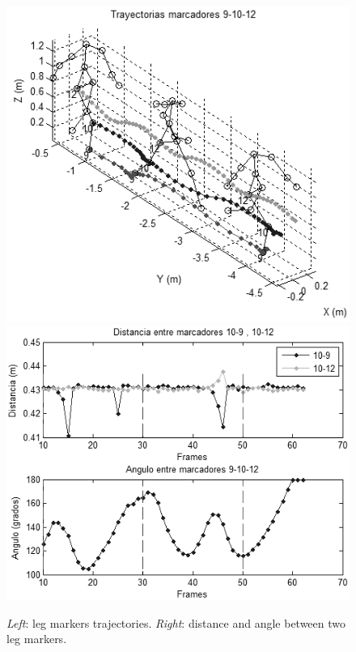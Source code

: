 \begin{figure}[ht!]
 \begin{center}
  {\includegraphics[scale=0.4]{imagenes/Seguimiento/050_Salida_Tracking_13_14_10} %
   }	
 {\includegraphics[scale=0.4]{imagenes/Seguimiento/051_Salida_Angulo_Distancia_13_14_10}\label{distancia_angulo_marcadores_piernas}}
  \end{center}
\caption{\textit{Left}: leg markers trajectories. \textit{Right}: distance and angle between two leg markers.}
\label{restricciones_tracking}
\end{figure}


